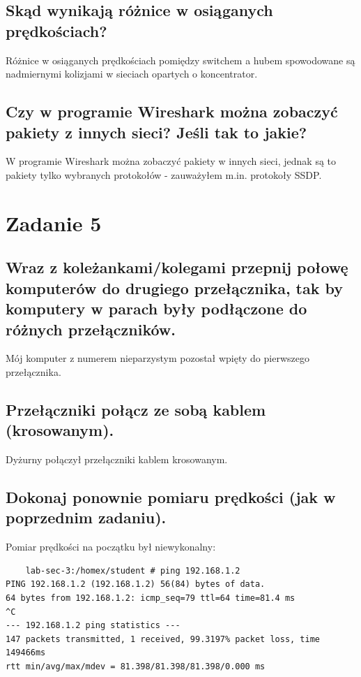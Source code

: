 \documentclass[polish, a4paper]{article}
\begin{document}
\subsection{Skąd wynikają różnice w osiąganych prędkościach?}
Różnice w osiąganych prędkościach pomiędzy switchem a hubem spowodowane są nadmiernymi kolizjami w sieciach opartych o koncentrator.

\subsection{Czy w programie Wireshark można zobaczyć pakiety z
innych sieci? Jeśli tak to jakie?}
W programie Wireshark można zobaczyć pakiety w innych sieci, jednak są to pakiety tylko wybranych protokołów - zauważyłem m.in. protokoły SSDP.



\section{Zadanie 5}
\subsection{Wraz z koleżankami/kolegami przepnij połowę komputerów do
drugiego przełącznika, tak by komputery w parach były
podłączone do różnych przełączników.}
Mój komputer z numerem nieparzystym pozostał wpięty do pierwszego przełącznika.

\subsection{Przełączniki połącz ze sobą kablem (krosowanym).}
Dyżurny połączył przełączniki kablem krosowanym.

\subsection{Dokonaj ponownie pomiaru prędkości (jak w poprzednim
zadaniu).}

Pomiar prędkości na początku był niewykonalny:
\begin{verbatim}
    lab-sec-3:/homex/student # ping 192.168.1.2
PING 192.168.1.2 (192.168.1.2) 56(84) bytes of data.
64 bytes from 192.168.1.2: icmp_seq=79 ttl=64 time=81.4 ms
^C
--- 192.168.1.2 ping statistics ---
147 packets transmitted, 1 received, 99.3197% packet loss, time 149466ms
rtt min/avg/max/mdev = 81.398/81.398/81.398/0.000 ms
\end{verbatim}
\end{document}
